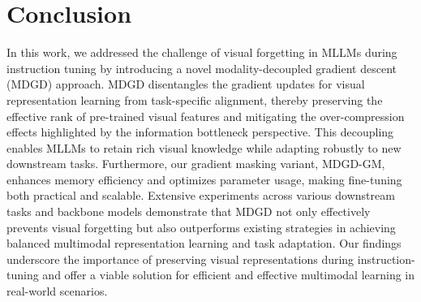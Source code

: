 \section{Conclusion}
In this work, we addressed the challenge of visual forgetting in MLLMs during instruction tuning by introducing a novel modality-decoupled gradient descent (MDGD) approach. MDGD disentangles the gradient updates for visual representation learning from task-specific alignment, thereby preserving the effective rank of pre-trained visual features and mitigating the over-compression effects highlighted by the information bottleneck perspective. This decoupling enables MLLMs to retain rich visual knowledge while adapting robustly to new downstream tasks. Furthermore, our gradient masking variant, MDGD-GM, enhances memory efficiency and optimizes parameter usage, making fine-tuning both practical and scalable. Extensive experiments across various downstream tasks and backbone models demonstrate that MDGD not only effectively prevents visual forgetting but also outperforms existing strategies in achieving balanced multimodal representation learning and task adaptation. Our findings underscore the importance of preserving visual representations during instruction-tuning and offer a viable solution for efficient and effective multimodal learning in real-world scenarios.

